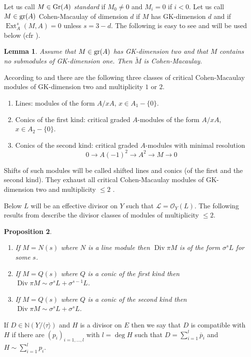 \documentclass{amsproc}
\def \NN{{\mathbb N}}
\def\Lscr{{\mathcal L}}
\def\Oscr{{\mathcal O}}
\def\gr{\mathop{\text{gr}}}
\def\Gr{\mathop{\text{Gr}}}
\def\Div{\operatorname{Div}}
\def\gr{\operatorname {gr}}
\def\Ext{\operatorname {Ext}}
\def\gr{\operatorname {gr}}
\def\r{\rightarrow}
\let\oldtext\text
\def\text#1{\oldtext{\upshape #1}}
\newtheorem{lemmas}{Lemma}[subsection]
\newtheorem{propositions}[lemmas]{Proposition}
\theoremstyle{definition}
\theoremstyle{remark}
\numberwithin{equation}{section}
\numberwithin{table}{section}
\numberwithin{figure}{section}
\def\gr{\mathop{\text{gr}}}
\def\Gr{\mathop{\text{Gr}}}
\begin{document}
Let us call $M\in \Gr(A)$ \emph{standard} if $M_0\neq 0$ and $M_i=0$ if
$i<0$. Let us call $M\in \gr(A)$ Cohen-Macaulay of dimension $d$ if
$M$ has GK-dimension $d$ and if $\Ext^s_A(M,A)=0$  unless $s=3-d$.
The following is easy to see and will be used below (cfr \cite{Aj1}).
\begin{lemmas}
  Assume that $M\in \gr(A)$ has GK-dimension two and that $M$ contains
  no submodules of GK-dimension one. Then $\tilde{M}$
   is Cohen-Macaulay.
\end{lemmas}
According to \cite{Ajitabh} and \cite{ATV2} there are the following
three classes of critical Cohen-Macaulay modules of GK-dimension two
and multiplicity $1$ or $2$.
\begin{enumerate}
\item Lines: modules of the form $A/xA$, $x\in A_1-\{0\}$.
\item Conics of the first kind: critical graded $A$-modules of the form
  $A/xA$, $x\in A_2-\{0\}$.
\item Conics of the second kind: critical graded $A$-modules with
  minimal resolution
\[ 0\r A(-1)^2\r A^2\r M\r 0\]
\end{enumerate}







Shifts of such modules will be called shifted lines and conics (of the
first and the second kind). They exhaust all critical Cohen-Macaulay
modules of GK-dimension two and multiplicity $\le 2$ \cite{Ajitabh}.

Below $L$ will be an effective divisor on $Y$ such that
$\Lscr=\Oscr_Y(L)$.  The following results from \cite{Ajitabh}
describe the divisor classes of modules of multiplicity $\le 2$.
\begin{propositions}
\label{ref:10.2.2a}
\begin{enumerate} 
\item If $M=N(s)$ where $N$ is a line module then $\Div\pi M$ is of the form
  $\sigma^s L$ for some $s$.
\item
 If $M=Q(s)$ where $Q$ is a conic of the first kind then $\Div
\pi M\sim \sigma^{s} L+ \sigma^{s-1}L$. 
\item
If $M=Q(s)$ where $Q$ is a 
conic of the second kind then $\Div \pi M\sim\sigma^{s} L+ \sigma^s L$.
\end{enumerate}
\end{propositions}
If $D\in \NN(Y/\langle\tau\rangle)$ and $H$ is a divisor  on $E$
then we  say that $D$ is compatible with $H$ if there are
$(p_i)_{i=1,\ldots,l}$ with $l=\deg H$ such that $D=\sum_{i=1}^{l}
\overline{p}_i$ and  $H\sim \sum_{i=1}^l p_i$. 
\end{document}
